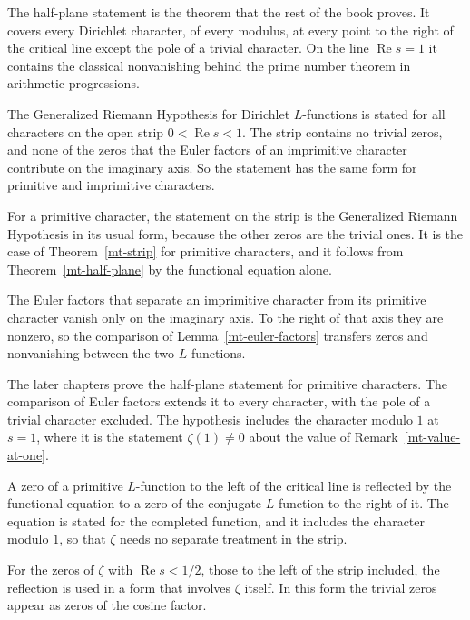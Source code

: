 The half-plane statement is the theorem that the rest of the book proves. It covers every Dirichlet
character, of every modulus, at every point to the right of the critical line except the pole of a
trivial character. On the line $\operatorname{Re}s=1$ it contains the classical nonvanishing behind
the prime number theorem in arithmetic progressions.

The Generalized Riemann Hypothesis for Dirichlet $L$-functions is stated for all characters on the
open strip $0<\operatorname{Re}s<1$. The strip contains no trivial zeros, and none of the zeros that
the Euler factors of an imprimitive character contribute on the imaginary axis. So the statement has
the same form for primitive and imprimitive characters.

For a primitive character, the statement on the strip is the Generalized Riemann Hypothesis in its
usual form, because the other zeros are the trivial ones. It is the case of
Theorem~\ref{mt-strip} for primitive characters, and it follows from
Theorem~\ref{mt-half-plane} by the functional equation alone.

The Euler factors that separate an imprimitive character from its primitive character vanish only
on the imaginary axis. To the right of that axis they are nonzero, so the comparison of
Lemma~\ref{mt-euler-factors} transfers zeros and nonvanishing between the two $L$-functions.

The later chapters prove the half-plane statement for primitive characters. The comparison of Euler
factors extends it to every character, with the pole of a trivial character excluded. The
hypothesis includes the character modulo $1$ at $s=1$, where it is the statement $\zeta(1)\neq0$
about the value of Remark~\ref{mt-value-at-one}.

A zero of a primitive $L$-function to the left of the critical line is reflected by the functional
equation to a zero of the conjugate $L$-function to the right of it. The equation is stated for the
completed function, and it includes the character modulo $1$, so that $\zeta$ needs no separate
treatment in the strip.

For the zeros of $\zeta$ with $\operatorname{Re}s<1/2$, those to the left of the strip included, the
reflection is used in a form that involves $\zeta$ itself. In this form the trivial zeros appear as
zeros of the cosine factor.

